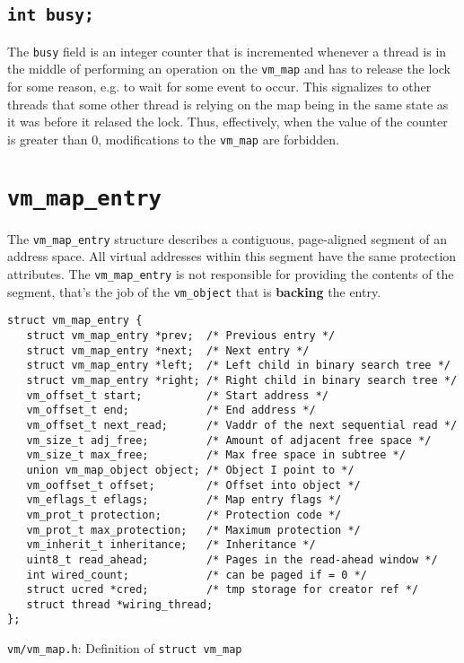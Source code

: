 \documentclass[shortabstract, english]{iithesis}
\begin{document}
\subsection*{\texttt{int busy;}}
The \texttt{busy} field is an integer counter that is incremented whenever a
thread is in the middle of performing an operation on the \texttt{vm_map} and
has to release the lock for some reason, e.g. to wait for some event to occur.
This signalizes to other threads that some other thread is relying on the map
being in the same state as it was before it relased the lock. Thus, effectively,
when the value of the counter is greater than 0, modifications to the
\texttt{vm_map} are forbidden.

\section{\texttt{vm_map_entry}}

The \texttt{vm_map_entry} structure describes a contiguous, page-aligned
segment of an address space. All virtual addresses within this segment have
the same protection attributes. The \texttt{vm_map_entry} is not responsible
for providing the contents of the segment, that's the job of the
\texttt{vm_object} that is \textbf{backing} the entry.

\begin{listing}[H]
\begin{verbatim}
struct vm_map_entry {
   struct vm_map_entry *prev;  /* Previous entry */
   struct vm_map_entry *next;  /* Next entry */
   struct vm_map_entry *left;  /* Left child in binary search tree */
   struct vm_map_entry *right; /* Right child in binary search tree */
   vm_offset_t start;          /* Start address */
   vm_offset_t end;            /* End address */
   vm_offset_t next_read;      /* Vaddr of the next sequential read */
   vm_size_t adj_free;         /* Amount of adjacent free space */
   vm_size_t max_free;         /* Max free space in subtree */
   union vm_map_object object; /* Object I point to */
   vm_ooffset_t offset;        /* Offset into object */
   vm_eflags_t eflags;         /* Map entry flags */
   vm_prot_t protection;       /* Protection code */
   vm_prot_t max_protection;   /* Maximum protection */
   vm_inherit_t inheritance;   /* Inheritance */
   uint8_t read_ahead;         /* Pages in the read-ahead window */
   int wired_count;            /* can be paged if = 0 */
   struct ucred *cred;         /* tmp storage for creator ref */
   struct thread *wiring_thread;
};
\end{verbatim}
\caption{\texttt{vm/vm\_map.h}: Definition of \texttt{struct vm_map}}
\end{listing}
\end{document}
